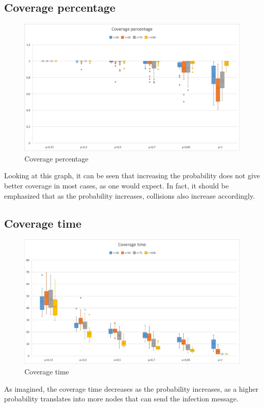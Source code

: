 \subsection{Coverage percentage}
\begin{figure}[h!]
\centering
    \includegraphics[width= 1\textwidth]{./images/Rate200Boxplot.png}
    \caption{Coverage percentage}
    \label{fig:immagine}
\end{figure}

\noindent Looking at this graph, it can be seen that increasing the probability does not give better coverage in most cases, as one would expect. In fact, it should be emphasized that as the probability increases, collisions also increase accordingly.

\subsection{Coverage time}
\begin{figure}
\centering
    \includegraphics[width= 1\textwidth]{./images/Time200Boxplot.png}
    \caption{Coverage time}
    \label{fig:immagine}
\end{figure}
\noindent As imagined, the coverage time decreases as the probability increases, as a higher probability translates into more nodes that can send the infection message.

